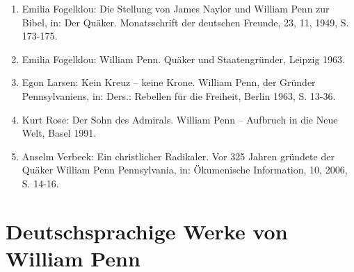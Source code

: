 \begin{enumerate}
 \item Emilia Fogelklou: Die Stellung von James Naylor und William Penn zur
Bibel, in: Der Quäker. Monatsschrift der deutschen Freunde, 23, 11, 1949, S.
173-175.
 \item Emilia Fogelklou: William Penn. Quäker und Staatengründer, Leipzig
1963.
 \item Egon Larsen: Kein Kreuz – keine Krone. William Penn, der Gründer
Pennsylvaniens, in: Ders.: Rebellen für die Freiheit, Berlin 1963, S. 13-36.
 \item Kurt Rose: Der Sohn des Admirals. William Penn – Aufbruch in die Neue
Welt, Basel 1991.
 \item Anselm Verbeek: Ein christlicher Radikaler. Vor 325 Jahren gründete der
Quäker William Penn Pennsylvania, in: Ökumenische Information, 10, 2006, S.
14-16.
\end{enumerate}


\section{Deutschsprachige Werke von William Penn}

